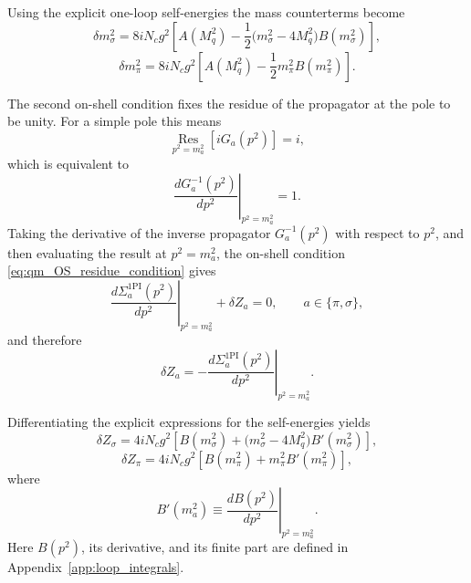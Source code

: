 Using the explicit one-loop self-energies the mass counterterms become
\begin{equation}
\delta m_\sigma^2
=
8 i N_c g^2
\left[
A(M_q^2)
-\frac{1}{2}\bigl(m_\sigma^2-4M_q^2\bigr)B(m_\sigma^2)
\right],
\label{eq:qm_delta_msigma}
\end{equation}
\begin{equation}
\delta m_\pi^2
=
8 i N_c g^2
\left[
A(M_q^2)
-\frac{1}{2}m_\pi^2 B(m_\pi^2)
\right].
\label{eq:qm_delta_mpi}
\end{equation}

The second on-shell condition fixes the residue of the propagator at
the pole to be unity. For a simple pole this means
\begin{equation}
\operatorname*{Res}_{p^2=m_a^2}\!\left[iG_a(p^2)\right] = i,
\end{equation}
which is equivalent to
\begin{equation}
\left.
\frac{dG_a^{-1}(p^2)}{dp^2}
\right|_{p^2=m_a^2}
=1.
\label{eq:qm_OS_residue_condition}
\end{equation}
Taking the derivative of the inverse propagator \(G_a^{-1}(p^2)\)
with respect to \(p^2\), and then evaluating the result at
\(p^2=m_a^2\), the on-shell condition
\eqref{eq:qm_OS_residue_condition} gives
\begin{equation}
\left.
\frac{d\Sigma_a^{\mathrm{1PI}}(p^2)}{dp^2}
\right|_{p^2=m_a^2}
+
\delta Z_a
=0,
\qquad a\in\{\pi,\sigma\},
\end{equation}
and therefore
\begin{equation}
\delta Z_a
=
-
\left.
\frac{d\Sigma_a^{\mathrm{1PI}}(p^2)}{dp^2}
\right|_{p^2=m_a^2}.
\label{eq:qm_delta_Z_general}
\end{equation}

Differentiating the explicit expressions for the self-energies yields
\begin{equation}
\delta Z_\sigma
=
4 i N_c g^2
\left[
B(m_\sigma^2)
+
\bigl(m_\sigma^2-4M_q^2\bigr)B'(m_\sigma^2)
\right],
\label{eq:qm_delta_Zsigma}
\end{equation}
\begin{equation}
\delta Z_\pi
=
4 i N_c g^2
\left[
B(m_\pi^2)
+
m_\pi^2 B'(m_\pi^2)
\right],
\label{eq:qm_delta_Zpi}
\end{equation}
where
\begin{equation}
B'(m_a^2)
\equiv
\left.
\frac{dB(p^2)}{dp^2}
\right|_{p^2=m_a^2}.
\end{equation}
Here \(B(p^2)\), its derivative, and its finite part are defined in
Appendix~\ref{app:loop_integrals}.

